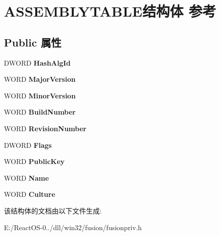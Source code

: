 \hypertarget{struct_a_s_s_e_m_b_l_y_t_a_b_l_e}{}\section{A\+S\+S\+E\+M\+B\+L\+Y\+T\+A\+B\+L\+E结构体 参考}
\label{struct_a_s_s_e_m_b_l_y_t_a_b_l_e}
\subsection*{Public 属性}
\begin{DoxyCompactItemize}
\item 
\mbox{\label{struct_a_s_s_e_m_b_l_y_t_a_b_l_e_a8f9aa6fe0b6b763fb04e08c69a2ed383}} 
D\+W\+O\+RD {\bfseries Hash\+Alg\+Id}
\item 
\mbox{\label{struct_a_s_s_e_m_b_l_y_t_a_b_l_e_a7b415f6e11e10b7b3b3c82b6050deac6}} 
W\+O\+RD {\bfseries Major\+Version}
\item 
\mbox{\label{struct_a_s_s_e_m_b_l_y_t_a_b_l_e_a5eabb1f9255c1a99b2157dedc8544a21}} 
W\+O\+RD {\bfseries Minor\+Version}
\item 
\mbox{\label{struct_a_s_s_e_m_b_l_y_t_a_b_l_e_a1a7a96b9d83468013a6b82689196f42a}} 
W\+O\+RD {\bfseries Build\+Number}
\item 
\mbox{\label{struct_a_s_s_e_m_b_l_y_t_a_b_l_e_a0f8f8bd38e0fd88c779466d32a6b88a4}} 
W\+O\+RD {\bfseries Revision\+Number}
\item 
\mbox{\label{struct_a_s_s_e_m_b_l_y_t_a_b_l_e_a4e8a606f9604a25e80c7daf315f6db24}} 
D\+W\+O\+RD {\bfseries Flags}
\item 
\mbox{\label{struct_a_s_s_e_m_b_l_y_t_a_b_l_e_a5b52aa17cbcdb7dc86e56683ffa44413}} 
W\+O\+RD {\bfseries Public\+Key}
\item 
\mbox{\label{struct_a_s_s_e_m_b_l_y_t_a_b_l_e_a52b6e4e90e3d8dfe8b4525d12a04b4f2}} 
W\+O\+RD {\bfseries Name}
\item 
\mbox{\label{struct_a_s_s_e_m_b_l_y_t_a_b_l_e_a5eb753d33ee0579ad9fccc495648220d}} 
W\+O\+RD {\bfseries Culture}
\end{DoxyCompactItemize}


该结构体的文档由以下文件生成\+:\begin{DoxyCompactItemize}
\item 
E\+:/\+React\+O\+S-\/0../dll/win32/fusion/fusionpriv.\+h\end{DoxyCompactItemize}
